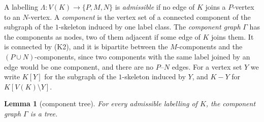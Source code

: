 \documentclass[11pt,letterpaper]{article}
\newtheorem{lemma}[theorem]{Lemma}
\theoremstyle{definition}
\begin{document}
A labelling $\Lambda\colon V(K)\to\{P,M,N\}$ is \emph{admissible} if no edge of $K$ joins a
$P$-vertex to an $N$-vertex. A \emph{component} is the vertex set of a connected component of the
subgraph of the $1$-skeleton induced by one label class. The \emph{component graph} $\Gamma$ has the
components as nodes, two of them adjacent if some edge of $K$ joins them. It is connected by (K2),
and it is bipartite between the $M$-components and the $(P\cup N)$-components, since two components
with the same label joined by an edge would be one component, and there are no $P$--$N$ edges. For a
vertex set $Y$ we write $K[Y]$ for the subgraph of the $1$-skeleton induced by $Y$, and $K-Y$ for
$K[V(K)\setminus Y]$.

\begin{lemma}[component tree]\label{lem:tree}
For every admissible labelling of $K$, the component graph $\Gamma$ is a tree.
\end{lemma}
\end{document}
